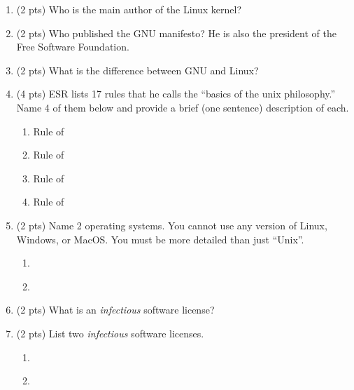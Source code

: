 \documentclass{article}
\begin{document}
\begin{enumerate}

\item
(2 pts)
Who is the main author of the Linux kernel?
\vspace{0.75in}

\item
(2 pts)
Who published the GNU manifesto?
He is also the president of the Free Software Foundation.
\vspace{0.75in}

\item
(2 pts)
What is the difference between GNU and Linux?
\vspace{0.75in}

\item
(4 pts)
ESR lists 17 rules that he calls the ``basics of the unix philosophy.''
Name 4 of them below and provide a brief (one sentence) description of each.
\begin{enumerate}
\item Rule of
\vspace{0.75in}
\item Rule of
\vspace{0.75in}
\item Rule of
\vspace{0.75in}
\item Rule of
\vspace{0.75in}
\end{enumerate}

\item
(2 pts)
Name 2 operating systems.
You cannot use any version of Linux, Windows, or MacOS.
You must be more detailed than just ``Unix''.
\begin{enumerate}
\item ~
\vspace{0.5in}
\item ~
\vspace{0.5in}
\end{enumerate}

\item
(2 pts)
What is an \emph{infectious} software license?
\vspace{1in}

\item
(2 pts)
List two \emph{infectious} software licenses.
\begin{enumerate}
\item ~
\vspace{0.5in}
\item ~
\vspace{0.5in}
\end{enumerate}


\end{enumerate}
\end{document}
